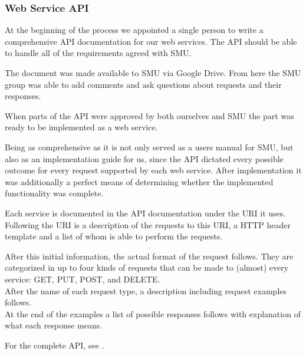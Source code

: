 \subsubsection{Web Service API}
At the beginning of the process we appointed a single person to write a comprehensive API documentation for our web services.
The API should be able to handle all of the requirements agreed  with SMU.

The document was made available to SMU via Google Drive. From here the SMU group was able to add comments and ask questions about requests and their responses.

When parts of the API were approved by both ourselves and SMU the part was ready to be implemented as a web service.

Being as comprehensive as it is not only served as a users manual for SMU,  but also as an implementation guide for us, since the API dictated every possible outcome for every request supported by each web service. After implementation it was additionally a perfect means of determining whether the implemented functionality was complete.

Each service is documented in the API documentation under the URI it uses. Following the URI is a description of the requests to this URI, a HTTP header template and a list of whom is able to perform the requests.

After this initial information, the actual format of the request follows. They are categorized in up to four kinds of requests that can be made to (almost) every service: GET, PUT, POST, and DELETE. \\
After the name of each request type, a description including request examples follows. \\
At the end of the examples a list of possible responses follows with explanation of what each response means.

For the complete API, see .